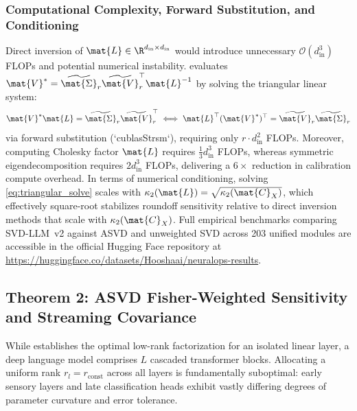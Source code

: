 \subsubsection{Computational Complexity, Forward Substitution, and Conditioning}
Direct inversion of $\mat{L} \in \R^{d_{\text{in}} \times d_{\text{in}}}$ would introduce unnecessary $\mathcal{O}(d_{\text{in}}^3)$ FLOPs and potential numerical instability. \neuralops{} evaluates $\mat{V}^* = \widetilde{\mat{\Sigma}}_r \widetilde{\mat{V}}_r^\top \mat{L}^{-1}$ by solving the triangular linear system:
\begin{equation}
\mat{V}^* \mat{L} = \widetilde{\mat{\Sigma}}_r \widetilde{\mat{V}}_r^\top \iff \mat{L}^\top (\mat{V}^*)^\top = \widetilde{\mat{V}}_r \widetilde{\mat{\Sigma}}_r
\label{eq:triangular_solve}
\end{equation}
via forward substitution (`cublasStrsm`), requiring only $r \cdot d_{\text{in}}^2$ FLOPs. Moreover, computing Cholesky factor $\mat{L}$ requires $\frac{1}{3} d_{\text{in}}^3$ FLOPs, whereas symmetric eigendecomposition requires $2 d_{\text{in}}^3$ FLOPs, delivering a $6\times$ reduction in calibration compute overhead. In terms of numerical conditioning, solving \eqref{eq:triangular_solve} scales with $\kappa_2(\mat{L}) = \sqrt{\kappa_2(\mat{C}_X)}$, which effectively square-root stabilizes roundoff sensitivity relative to direct inversion methods that scale with $\kappa_2(\mat{C}_X)$. Full empirical benchmarks comparing SVD-LLM~v2 against ASVD and unweighted SVD across 203 unified modules are accessible in the official Hugging Face repository at \url{https://huggingface.co/datasets/Hooshaai/neuralops-results}.

\subsection{Theorem 2: ASVD Fisher-Weighted Sensitivity and Streaming Covariance}
\label{sec:thm_asvd_sensitivity}

While  establishes the optimal low-rank factorization for an isolated linear layer, a deep language model comprises $L$ cascaded transformer blocks. Allocating a uniform rank $r_l = r_{\text{const}}$ across all layers is fundamentally suboptimal: early sensory layers and late classification heads exhibit vastly differing degrees of parameter curvature and error tolerance.


